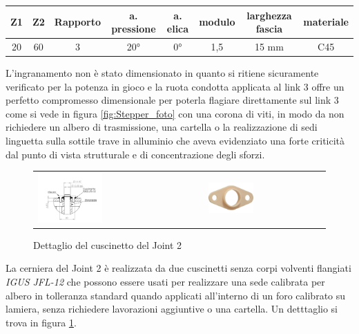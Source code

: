 \documentclass[%
corpo=11pt,
twoside,
 stile=classica,
oldstyle,
greek,%
]{toptesi}
\begin{document}
			\begin{tabular}{|c|c|c|c|c|c|c|c|}
			
			\hline
			Z1 & Z2 & Rapporto & a. pressione & a. elica & modulo & larghezza fascia & materiale \\
			\hline
			20 & 60 & 3 & 20° & 0°  & 1,5 & 15 mm & C45  \\
			\hline
			
		\end{tabular}
		
		L'ingranamento non è stato dimensionato in quanto si ritiene sicuramente verificato per la potenza in gioco e la ruota condotta applicata al link 3 offre un perfetto compromesso dimensionale per poterla flagiare direttamente sul link 3 come si vede in figura \ref{fig:Stepper_foto} con una corona di viti, in modo da non richiedere un albero di trasmissione, una cartella o la realizzazione di sedi linguetta sulla sottile trave in alluminio che aveva evidenziato una forte criticità dal punto di vista strutturale e di concentrazione degli sforzi. 
		
		\begin{figure} [!ht]
		\centering
			\begin{tabular}{ll}
				\includegraphics[width=0.4\textwidth]{Screen/cuscinetto.png}
				&
				\includegraphics[width=0.4\textwidth]{image/jfl12.jpg}
			\end{tabular}				
		\caption{Dettaglio del cuscinetto del Joint 2}
		\label{fig:cuscinetto_foto}
		\end{figure}		
		
		La cerniera del Joint 2 è realizzata da due cuscinetti senza corpi volventi flangiati \textit{IGUS JFL-12} che possono essere usati per realizzare una sede calibrata per albero in tolleranza standard quando applicati all'interno di un foro calibrato su lamiera, senza richiedere lavorazioni aggiuntive o una cartella. Un detttaglio si trova in figura \ref{fig:cuscinetto_foto}.
	
\end{document}
